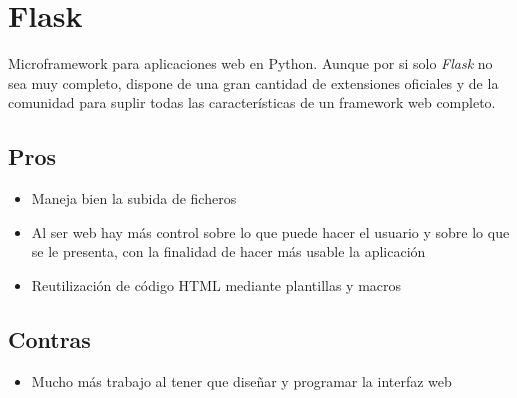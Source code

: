 \section{Flask}
Microframework para aplicaciones web en Python. Aunque por si solo \textit{Flask} no sea muy completo, dispone de una gran cantidad de extensiones oficiales y de la comunidad para suplir todas las características de un framework web completo.
\subsection{Pros}
\begin{itemize}
	\item Maneja bien la subida de ficheros
	\item Al ser web hay más control sobre lo que puede hacer el usuario y sobre lo que se le presenta, con la finalidad de hacer más usable la aplicación
	\item Reutilización de código HTML mediante plantillas y macros
\end{itemize}
\subsection{Contras}
\begin{itemize}
	\item Mucho más trabajo al tener que diseñar y programar la interfaz web
\end{itemize}
